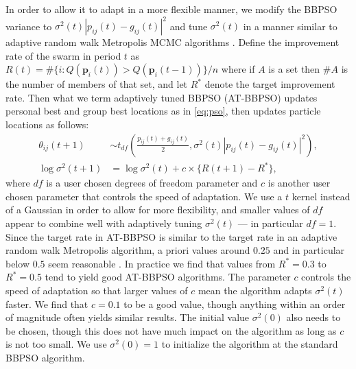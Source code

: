\documentclass[12pt]{article}
\begin{document}
In order to allow it to adapt in a more flexible manner, we modify the BBPSO variance to $\sigma^2(t)|p_{ij}(t) - g_{ij}(t)|^2$ and tune $\sigma^2(t)$ in a manner similar to adaptive random walk Metropolis MCMC algorithms \citep{andrieu2008tutorial}. Define the improvement rate of the swarm in period $t$ as $R(t) = \#\{i:Q(\bm{p}_i(t))> Q(\bm{p}_i(t-1))\}/n$ where if $A$ is a set then $\#A$ is the number of members of that set, and let $R^*$ denote the target improvement rate. Then what we term adaptively tuned BBPSO (AT-BBPSO) updates personal best and group best locations as in \eqref{eq:pso}, then updates particle locations as follows:
\begin{align}\label{eq:at-bbpso}
\theta_{ij}(t+1) &\sim t_{df}\left(\frac{p_{ij}(t) + g_{ij}(t)}{2}, \sigma^2(t)|p_{ij}(t) - g_{ij}(t)|^2\right),\nonumber\\
\log \sigma^2(t+1) &= \log\sigma^2(t) + c\times\{R(t+1) - R^*\},
\end{align}
where $df$ is a user chosen degrees of freedom parameter and $c$ is another user chosen parameter that controls the speed of adaptation. We use a $t$ kernel instead of a Gaussian in order to allow for more flexibility, and smaller values of $df$ appear to combine well with adaptively tuning $\sigma^2(t)$ --- in particular $df=1$. Since the target rate in AT-BBPSO is similar to the target rate in an adaptive random walk Metropolis algorithm, a priori values around $0.25$ and in particular below $0.5$ seem reasonable \citep{gelman1996efficient}. In practice we find that values from $R^*=0.3$ to $R^*=0.5$ tend to yield good AT-BBPSO algorithms. The parameter $c$ controls the speed of adaptation so that larger values of $c$ mean the algorithm adapts $\sigma^2(t)$ faster. We find that $c=0.1$ to be a good value, though anything within an order of magnitude often yields similar results. The initial value $\sigma^2(0)$ also needs to be chosen, though this does not have much impact on the algorithm as long as $c$ is not too small. We use $\sigma^2(0)=1$ to initialize the algorithm at the standard BBPSO algorithm.
\end{document}
